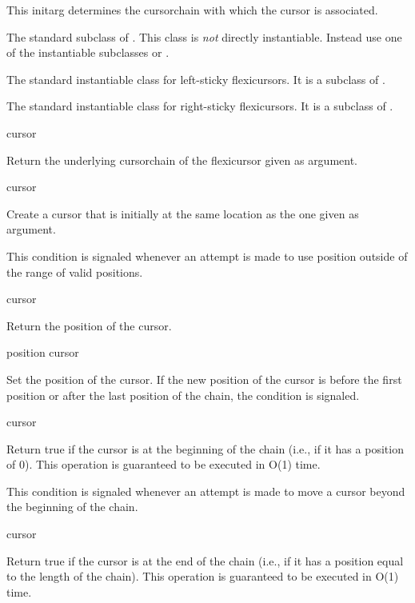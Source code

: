 \documentclass[11pt]{article}
\begin{document}
This initarg determines the cursorchain with which the cursor is associated. 


The standard subclass of .  This class is \emph{not}
directly instantiable.  Instead use one of the instantiable subclasses
 or .


The standard instantiable class for left-sticky flexicursors.  It is a
subclass of . 


The standard instantiable class for right-sticky flexicursors.  It is a
subclass of . 

 {cursor}

Return the underlying cursorchain of the flexicursor given
as argument. 

 {cursor}

Create a cursor that is initially at the same location as the one
given as argument.  


This condition is signaled whenever an attempt is made to use position
outside of the range of valid positions. 

 {cursor}

Return the position of the cursor.

 {position cursor}

Set the position of the cursor.  If the new position of the cursor is
before the first position or after the last position of the chain, the
condition  is signaled. 

 {cursor}

Return true if the cursor is at the beginning of the chain (i.e., if
it has a position of 0).  This operation is guaranteed to be executed
in O(1) time. 


This condition is signaled whenever an attempt is made to move a
cursor beyond the beginning of the chain. 

 {cursor}

Return true if the cursor is at the end of the chain (i.e., if it has
a position equal to the length of the chain).  This operation is
guaranteed to be executed in O(1) time.
\end{document}
